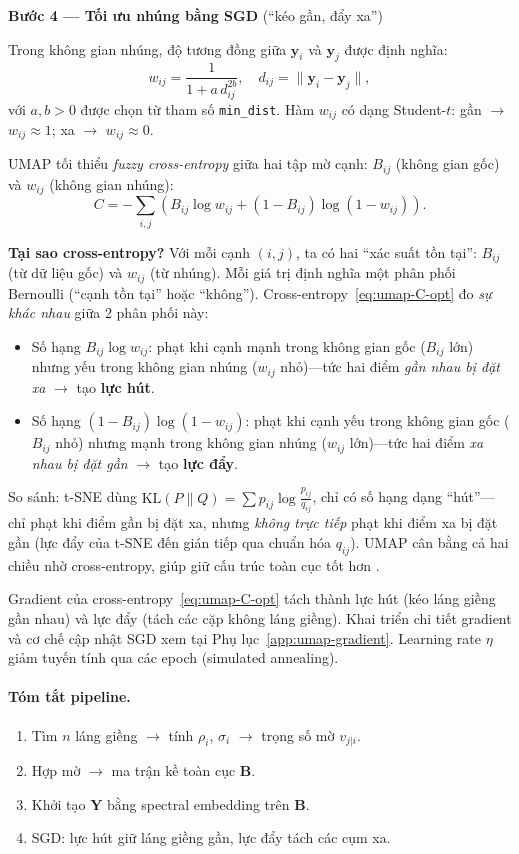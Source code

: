 \textbf{Bước 4 --- Tối ưu nhúng bằng SGD} (``kéo gần, đẩy xa'')

Trong không gian nhúng, độ tương đồng giữa $\mathbf{y}_i$ và $\mathbf{y}_j$ được định nghĩa:
\[
w_{ij} = \frac{1}{1 + a\, d_{ij}^{2b}}, \quad d_{ij} = \|\mathbf{y}_i - \mathbf{y}_j\|,
\]
với $a, b > 0$ được chọn từ tham số \texttt{min\_dist}. Hàm $w_{ij}$ có dạng Student-$t$: gần $\to$ $w_{ij} \approx 1$; xa $\to$ $w_{ij} \approx 0$.

UMAP tối thiểu \emph{fuzzy cross-entropy} giữa hai tập mờ cạnh: $B_{ij}$ (không gian gốc) và $w_{ij}$ (không gian nhúng):
\begin{equation}
C = -\sum_{i,j} \left( B_{ij} \log w_{ij} + (1-B_{ij}) \log(1-w_{ij}) \right).
\label{eq:umap-C-opt}
\end{equation}

\textbf{Tại sao cross-entropy?} Với mỗi cạnh $(i,j)$, ta có hai ``xác suất tồn tại'': $B_{ij}$ (từ dữ liệu gốc) và $w_{ij}$ (từ nhúng). Mỗi giá trị định nghĩa một phân phối Bernoulli (``cạnh tồn tại'' hoặc ``không''). Cross-entropy~\eqref{eq:umap-C-opt} đo \emph{sự khác nhau} giữa 2 phân phối này: 
\begin{itemize}
  \item Số hạng $B_{ij}\log w_{ij}$: phạt khi cạnh mạnh trong không gian gốc ($B_{ij}$ lớn) nhưng yếu trong không gian nhúng ($w_{ij}$ nhỏ)---tức hai điểm \emph{gần nhau bị đặt xa} $\to$ tạo \textbf{lực hút}.
  \item Số hạng $(1-B_{ij})\log(1-w_{ij})$: phạt khi cạnh yếu trong không gian gốc ($B_{ij}$ nhỏ) nhưng mạnh trong không gian nhúng ($w_{ij}$ lớn)---tức hai điểm \emph{xa nhau bị đặt gần} $\to$ tạo \textbf{lực đẩy}.
\end{itemize}
So sánh: t-SNE dùng $\mathrm{KL}(P\|Q) = \sum p_{ij}\log\frac{p_{ij}}{q_{ij}}$, chỉ có số hạng dạng ``hút''---chỉ phạt khi điểm gần bị đặt xa, nhưng \emph{không trực tiếp} phạt khi điểm xa bị đặt gần (lực đẩy của t-SNE đến gián tiếp qua chuẩn hóa $q_{ij}$). UMAP cân bằng cả hai chiều nhờ cross-entropy, giúp giữ cấu trúc toàn cục tốt hơn \cite{mcinnes2018umap}.

Gradient của cross-entropy~\eqref{eq:umap-C-opt} tách thành lực hút (kéo láng giềng gần nhau) và lực đẩy (tách các cặp không láng giềng). Khai triển chi tiết gradient và cơ chế cập nhật SGD xem tại Phụ lục~\ref{app:umap-gradient}. Learning rate $\eta$ giảm tuyến tính qua các epoch (simulated annealing).

\paragraph{Tóm tắt pipeline.}
\begin{enumerate}
  \item Tìm $n$ láng giềng $\to$ tính $\rho_i$, $\sigma_i$ $\to$ trọng số mờ $v_{j|i}$.
  \item Hợp mờ $\to$ ma trận kề toàn cục $\mathbf{B}$.
  \item Khởi tạo $\mathbf{Y}$ bằng spectral embedding trên $\mathbf{B}$.
  \item SGD: lực hút giữ láng giềng gần, lực đẩy tách các cụm xa.
\end{enumerate}

